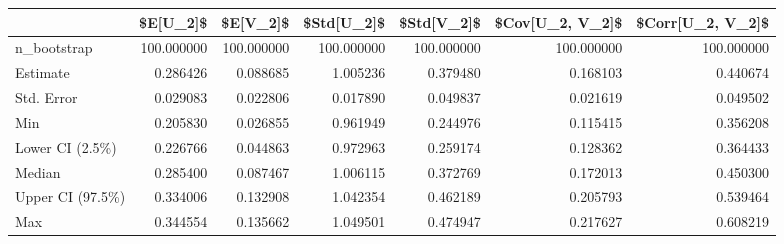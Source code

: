 \begin{tabular}{lrrrrrr}
\toprule
{} &    \$E[U\_2]\$ &    \$E[V\_2]\$ &  \$Std[U\_2]\$ &  \$Std[V\_2]\$ &  \$Cov[U\_2, V\_2]\$ &  \$Corr[U\_2, V\_2]\$ \\
\midrule
n\_bootstrap      &  100.000000 &  100.000000 &  100.000000 &  100.000000 &       100.000000 &        100.000000 \\
Estimate         &    0.286426 &    0.088685 &    1.005236 &    0.379480 &         0.168103 &          0.440674 \\
Std. Error       &    0.029083 &    0.022806 &    0.017890 &    0.049837 &         0.021619 &          0.049502 \\
Min              &    0.205830 &    0.026855 &    0.961949 &    0.244976 &         0.115415 &          0.356208 \\
Lower CI (2.5\%)  &    0.226766 &    0.044863 &    0.972963 &    0.259174 &         0.128362 &          0.364433 \\
Median           &    0.285400 &    0.087467 &    1.006115 &    0.372769 &         0.172013 &          0.450300 \\
Upper CI (97.5\%) &    0.334006 &    0.132908 &    1.042354 &    0.462189 &         0.205793 &          0.539464 \\
Max              &    0.344554 &    0.135662 &    1.049501 &    0.474947 &         0.217627 &          0.608219 \\
\bottomrule
\end{tabular}
